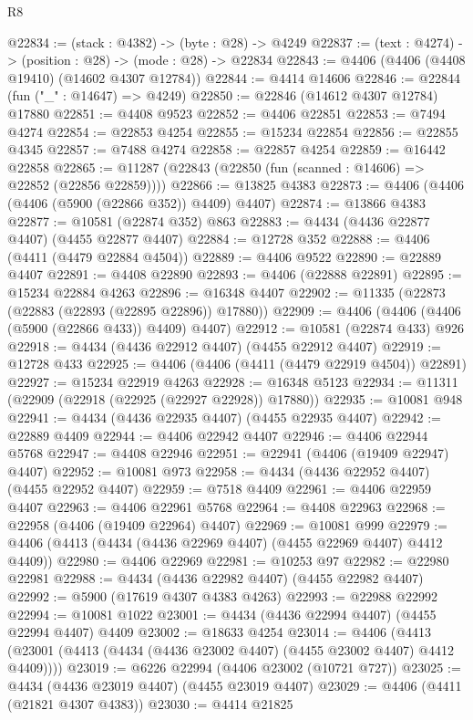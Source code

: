 \begin{lexlean}{R8}
\begin{coremodule}
@22834 := (stack : @4382) -> (byte : @28) -> @4249
@22837 := (text : @4274) -> (position : @28) -> (mode : @28) -> @22834
@22843 := @4406 (@4406 (@4408 @19410) (@14602 @4307 @12784))
@22844 := @4414 @14606
@22846 := @22844 (fun ("_" : @14647) => @4249)
@22850 := @22846 (@14612 @4307 @12784) @17880
@22851 := @4408 @9523
@22852 := @4406 @22851
@22853 := @7494 @4274
@22854 := @22853 @4254
@22855 := @15234 @22854
@22856 := @22855 @4345
@22857 := @7488 @4274
@22858 := @22857 @4254
@22859 := @16442 @22858
@22865 := @11287 (@22843 (@22850 (fun (scanned : @14606) => @22852 (@22856 @22859))))
@22866 := @13825 @4383
@22873 := @4406 (@4406 (@4406 (@5900 (@22866 @352)) @4409) @4407)
@22874 := @13866 @4383
@22877 := @10581 (@22874 @352) @863
@22883 := @4434 (@4436 @22877 @4407) (@4455 @22877 @4407)
@22884 := @12728 @352
@22888 := @4406 (@4411 (@4479 @22884 @4504))
@22889 := @4406 @9522
@22890 := @22889 @4407
@22891 := @4408 @22890
@22893 := @4406 (@22888 @22891)
@22895 := @15234 @22884 @4263
@22896 := @16348 @4407
@22902 := @11335 (@22873 (@22883 (@22893 (@22895 @22896)) @17880))
@22909 := @4406 (@4406 (@4406 (@5900 (@22866 @433)) @4409) @4407)
@22912 := @10581 (@22874 @433) @926
@22918 := @4434 (@4436 @22912 @4407) (@4455 @22912 @4407)
@22919 := @12728 @433
@22925 := @4406 (@4406 (@4411 (@4479 @22919 @4504)) @22891)
@22927 := @15234 @22919 @4263
@22928 := @16348 @5123
@22934 := @11311 (@22909 (@22918 (@22925 (@22927 @22928)) @17880))
@22935 := @10081 @948
@22941 := @4434 (@4436 @22935 @4407) (@4455 @22935 @4407)
@22942 := @22889 @4409
@22944 := @4406 @22942 @4407
@22946 := @4406 @22944 @5768
@22947 := @4408 @22946
@22951 := @22941 (@4406 (@19409 @22947) @4407)
@22952 := @10081 @973
@22958 := @4434 (@4436 @22952 @4407) (@4455 @22952 @4407)
@22959 := @7518 @4409
@22961 := @4406 @22959 @4407
@22963 := @4406 @22961 @5768
@22964 := @4408 @22963
@22968 := @22958 (@4406 (@19409 @22964) @4407)
@22969 := @10081 @999
@22979 := @4406 (@4413 (@4434 (@4436 @22969 @4407) (@4455 @22969 @4407) @4412 @4409))
@22980 := @4406 @22969
@22981 := @10253 @97
@22982 := @22980 @22981
@22988 := @4434 (@4436 @22982 @4407) (@4455 @22982 @4407)
@22992 := @5900 (@17619 @4307 @4383 @4263)
@22993 := @22988 @22992
@22994 := @10081 @1022
@23001 := @4434 (@4436 @22994 @4407) (@4455 @22994 @4407) @4409
@23002 := @18633 @4254
@23014 := @4406
    (@4413 (@23001 (@4413 (@4434 (@4436 @23002 @4407) (@4455 @23002 @4407) @4412 @4409))))
@23019 := @6226 @22994 (@4406 @23002 (@10721 @727))
@23025 := @4434 (@4436 @23019 @4407) (@4455 @23019 @4407)
@23029 := @4406 (@4411 (@21821 @4307 @4383))
@23030 := @4414 @21825

\end{coremodule}
\end{lexlean}
